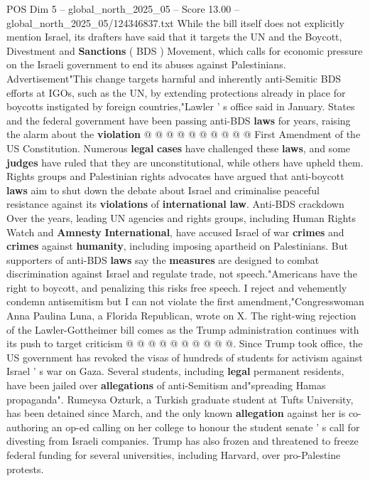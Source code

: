 \begin{textsample}{POS Dim 5 – global\_north\_2025\_05 – Score 13.00 – global\_north\_2025\_05/124346837.txt}
While the bill itself does not explicitly mention Israel, its drafters have said that it targets the UN and the Boycott, Divestment and \textbf{Sanctions} ( BDS ) Movement, which calls for economic pressure on the Israeli government to end its abuses against Palestinians.
Advertisement"This change targets harmful and inherently anti-Semitic BDS efforts at IGOs, such as the UN, by extending protections already in place for boycotts instigated by foreign countries,"Lawler ' s office said in January.
States and the federal government have been passing anti-BDS \textbf{laws} for years, raising the alarm about the \textbf{violation} @ @ @ @ @ @ @ @ @ @ First Amendment of the US Constitution.
Numerous \textbf{legal} \textbf{cases} have challenged these \textbf{laws}, and some \textbf{judges} have ruled that they are unconstitutional, while others have upheld them.
Rights groups and Palestinian rights advocates have argued that anti-boycott \textbf{laws} aim to shut down the debate about Israel and criminalise peaceful resistance against its \textbf{violations} of \textbf{international} \textbf{law}.
Anti-BDS crackdown Over the years, leading UN agencies and rights groups, including Human Rights Watch and \textbf{Amnesty} \textbf{International}, have accused Israel of war \textbf{crimes} and \textbf{crimes} against \textbf{humanity}, including imposing apartheid on Palestinians.
But supporters of anti-BDS \textbf{laws} say the \textbf{measures} are designed to combat discrimination against Israel and regulate trade, not speech."Americans have the right to boycott, and penalizing this risks free speech.
I reject and vehemently condemn antisemitism but I can not violate the first amendment,"Congresswoman Anna Paulina Luna, a Florida Republican, wrote on X.
The right-wing rejection of the Lawler-Gottheimer bill comes as the Trump administration continues with its push to target criticism @ @ @ @ @ @ @ @ @ @.
Since Trump took office, the US government has revoked the visas of hundreds of students for activism against Israel ' s war on Gaza.
Several students, including \textbf{legal} permanent residents, have been jailed over \textbf{allegations} of anti-Semitism and"spreading Hamas propaganda".
Rumeysa Ozturk, a Turkish graduate student at Tufts University, has been detained since March, and the only known \textbf{allegation} against her is co-authoring an op-ed calling on her college to honour the student senate ' s call for divesting from Israeli companies.
Trump has also frozen and threatened to freeze federal funding for several universities, including Harvard, over pro-Palestine protests.

\end{textsample}

